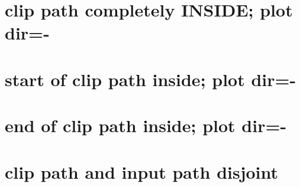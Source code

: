 \documentclass[a4paper]{article}
\begin{document}
\section{clip path completely INSIDE; plot dir=-}
	\def\inputValue{%
		\pgfsyssoftpath@movetotoken {170.71646pt}{0.0pt}%
		\pgfsyssoftpath@linetotoken {142.26372pt}{28.45274pt}%
		\pgfsyssoftpath@linetotoken {113.81097pt}{0.0pt}%
		\pgfsyssoftpath@linetotoken {85.35823pt}{28.45274pt}%
		\pgfsyssoftpath@linetotoken {56.90549pt}{0.0pt}%
	}
	\def\clippath{%
		\pgfsyssoftpath@movetotoken {80.0pt}{40.0pt}%
		\pgfsyssoftpath@linetotoken {80.0pt}{-40pt}%
		\pgfsyssoftpath@linetotoken {130.0pt}{-40pt}%
		\pgfsyssoftpath@linetotoken {130.0pt}{40pt}%
		\pgfsyssoftpath@linetotoken {80.0pt}{40pt}%
	}%
	\def\expected{%
		\pgfsyssoftpath@movetotoken {130.0119pt}{16.18913pt}\pgfsyssoftpath@linetotoken {113.81097pt}{0.0pt}\pgfsyssoftpath@linetotoken {85.35823pt}{28.45274pt}\pgfsyssoftpath@linetotoken {80.00732pt}{23.09595pt}%
	}
	\TESTCASE

\section{start of clip path inside; plot dir=-}
	\def\clippath{%
		\pgfsyssoftpath@movetotoken {80.0pt}{40.0pt}%
		\pgfsyssoftpath@linetotoken {80.0pt}{-40pt}%
		\pgfsyssoftpath@linetotoken {200.0pt}{-40pt}%
		\pgfsyssoftpath@linetotoken {200.0pt}{40pt}%
		\pgfsyssoftpath@linetotoken {80.0pt}{40pt}%
	}%
	\def\expected{%
		\pgfsyssoftpath@movetotoken {170.71646pt}{0.0pt}\pgfsyssoftpath@linetotoken {142.26372pt}{28.45274pt}\pgfsyssoftpath@linetotoken {113.81097pt}{0.0pt}\pgfsyssoftpath@linetotoken {85.35823pt}{28.45274pt}\pgfsyssoftpath@linetotoken {80.00732pt}{23.09595pt}%
	}
	\TESTCASE

	\section{end of clip path inside; plot dir=-}
	\def\clippath{%
		\pgfsyssoftpath@movetotoken {10.0pt}{40.0pt}%
		\pgfsyssoftpath@linetotoken {10.0pt}{-40pt}%
		\pgfsyssoftpath@linetotoken {130.0pt}{-40pt}%
		\pgfsyssoftpath@linetotoken {130.0pt}{40pt}%
		\pgfsyssoftpath@linetotoken {10.0pt}{40pt}%
	}%
	\def\expected{%
		\pgfsyssoftpath@movetotoken {130.0119pt}{16.18913pt}\pgfsyssoftpath@linetotoken {113.81097pt}{0.0pt}\pgfsyssoftpath@linetotoken {85.35823pt}{28.45274pt}\pgfsyssoftpath@linetotoken {56.90549pt}{0.0pt}%
	}
	\TESTCASE

\section{clip path and input path disjoint}
	\def\clippath{%
		\pgfsyssoftpath@movetotoken {180.0pt}{40.0pt}%
		\pgfsyssoftpath@linetotoken {180.0pt}{-40pt}%
		\pgfsyssoftpath@linetotoken {280.0pt}{-40pt}%
		\pgfsyssoftpath@linetotoken {280.0pt}{40pt}%
		\pgfsyssoftpath@linetotoken {180.0pt}{40pt}%
	}%
	\def\expected{%
	}
	\TESTCASE
\end{document}
